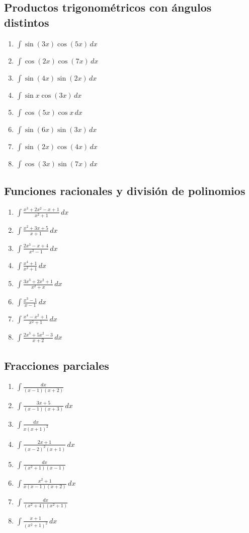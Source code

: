 \documentclass[12pt]{article}
\theoremstyle{definition}
\theoremstyle{remark}
\begin{document}
\subsection{Productos trigonométricos con ángulos distintos}
\begin{enumerate}[label=\arabic*.,start=201]
\item $\displaystyle \int \sin(3x)\cos(5x)\,dx$
\item $\displaystyle \int \cos(2x)\cos(7x)\,dx$
\item $\displaystyle \int \sin(4x)\sin(2x)\,dx$
\item $\displaystyle \int \sin x\cos(3x)\,dx$
\item $\displaystyle \int \cos(5x)\cos x\,dx$
\item $\displaystyle \int \sin(6x)\sin(3x)\,dx$
\item $\displaystyle \int \sin(2x)\cos(4x)\,dx$
\item $\displaystyle \int \cos(3x)\sin(7x)\,dx$
\end{enumerate}

\subsection{Funciones racionales y división de polinomios}
\begin{enumerate}[label=\arabic*.,start=209]
\item $\displaystyle \int \frac{x^3+2x^2-x+1}{x^2+1}\,dx$
\item $\displaystyle \int \frac{x^2+3x+5}{x+1}\,dx$
\item $\displaystyle \int \frac{2x^3-x+4}{x^2-1}\,dx$
\item $\displaystyle \int \frac{x^4+1}{x^2+1}\,dx$
\item $\displaystyle \int \frac{3x^3+2x^2+1}{x^2+x}\,dx$
\item $\displaystyle \int \frac{x^3-1}{x-1}\,dx$
\item $\displaystyle \int \frac{x^4-x^2+1}{x^2+1}\,dx$
\item $\displaystyle \int \frac{2x^3+5x^2-3}{x+2}\,dx$
\end{enumerate}

\subsection{Fracciones parciales}
\begin{enumerate}[label=\arabic*.,start=217]
\item $\displaystyle \int \frac{dx}{(x-1)(x+2)}$
\item $\displaystyle \int \frac{3x+5}{(x-1)(x+3)}\,dx$
\item $\displaystyle \int \frac{dx}{x(x+1)^2}$
\item $\displaystyle \int \frac{2x+1}{(x-2)^2(x+1)}\,dx$
\item $\displaystyle \int \frac{dx}{(x^2+1)(x-1)}$
\item $\displaystyle \int \frac{x^2+1}{x(x-1)(x+2)}\,dx$
\item $\displaystyle \int \frac{dx}{(x^2+4)(x^2+1)}$
\item $\displaystyle \int \frac{x+1}{(x^2+1)^2}\,dx$
\end{enumerate}
\end{document}
